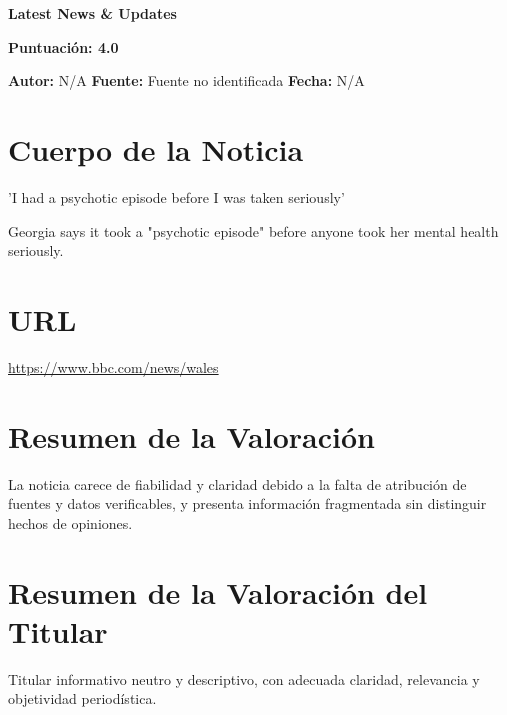 \documentclass[10pt,a4paper]{article}
\begin{document}
\begin{center}
    {\Huge\bfseries Latest News \& Updates\par}
    \vspace{0.5em}
    {\large\bfseries Puntuación: 4.0\par}
\end{center}
\vspace{1em}

\noindent\textbf{Autor:} N/A \hfill \textbf{Fuente:} Fuente no identificada \hfill \textbf{Fecha:} N/A\par
\vspace{1em}

\section*{Cuerpo de la Noticia}
\setlength{\parskip}{1em}
\setlength{\parindent}{0em}
'I had a psychotic episode before I was taken seriously'
\par\medskip
Georgia says it took a "psychotic episode" before anyone took her mental health seriously.
\vspace{1em}

\section*{URL}
\url{ https://www.bbc.com/news/wales }
\vspace{1em}

\section*{Resumen de la Valoración}
    La noticia carece de fiabilidad y claridad debido a la falta de atribuci\'{o}n de fuentes y datos verificables, y presenta informaci\'{o}n fragmentada sin distinguir hechos de opiniones.
\vspace{1em}

\section*{Resumen de la Valoración del Titular}
    Titular informativo neutro y descriptivo, con adecuada claridad, relevancia y objetividad period\'{i}stica.
\vspace{1em}
\end{document}
